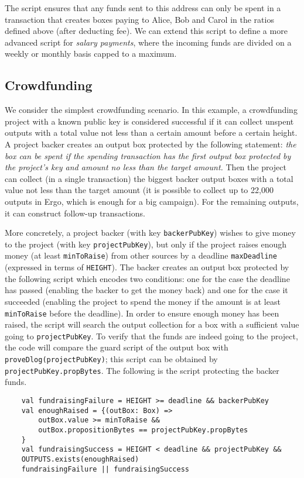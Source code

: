 \documentclass[runningheads]{llncs}
\begin{document}
The script ensures that any funds sent to this address can only be spent in a transaction that creates boxes paying to Alice, Bob and Carol in the ratios defined above (after deducting fee).
We can extend this script to define a more advanced script for {\em salary payments}, where the incoming funds are divided on a weekly or monthly basis capped to a maximum. 


\subsection{Crowdfunding}
\label{crowfunding}

We consider the simplest crowdfunding scenario. In this example, a crowdfunding project with a known public key is considered successful if it can collect unspent outputs with a total value not less than a certain amount before a certain height. A project backer creates an output box protected by the following statement: {\em the box can be spent if the spending transaction has the first output box protected by the project’s key and amount no less than the target amount.} Then the project can collect (in a single transaction) the biggest
backer output boxes with a total value not less than the target amount (it
is possible to collect up to 22,000 outputs in Ergo, which is enough for a big campaign). For the remaining outputs, it can construct
follow-up transactions.

More concretely, a project backer (with key \texttt{backerPubKey}) wishes to give money to the project (with key \texttt{projectPubKey}), but only if the project raises enough money (at least \texttt{minToRaise}) from other sources by a deadline \texttt{maxDeadline} (expressed in terms of \texttt{HEIGHT}). The backer creates an output box protected by the following script which encodes two conditions: one for the case the deadline has passed (enabling the
 backer to get the money back) and one for the case it succeeded (enabling the project to spend
 the money if the amount is at least \texttt{minToRaise} before the deadline). In order to ensure enough  money has been raised, the script will search the output collection for a box with a sufficient value going to \texttt{projectPubKey}. To verify that the funds are indeed going to the project, the code will compare the guard script of the output box with \texttt{proveDlog(projectPubKey)}; this script can be obtained by \texttt{projectPubKey.propBytes}. The following is the script protecting the backer funds.
\begin{verbatim}
    val fundraisingFailure = HEIGHT >= deadline && backerPubKey
    val enoughRaised = {(outBox: Box) =>
        outBox.value >= minToRaise &&
        outBox.propositionBytes == projectPubKey.propBytes
    }
    val fundraisingSuccess = HEIGHT < deadline && projectPubKey &&
    OUTPUTS.exists(enoughRaised)
    fundraisingFailure || fundraisingSuccess
\end{verbatim}
\end{document}
